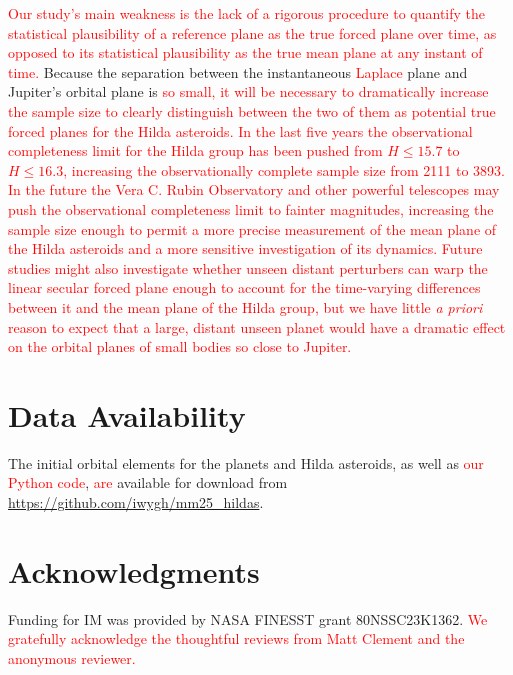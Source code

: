 \documentclass[a4paper,fleqn]{cas-sc}
\begin{document}
\begin{linenumbers}
\textcolor{red}{
Our study's main weakness is
the lack of a rigorous procedure to quantify the statistical plausibility of a reference plane as the true forced plane over time, as opposed to its statistical plausibility as the true mean plane at any instant of time.}
Because the separation between the instantaneous \textcolor{red}{Laplace} plane and  Jupiter's orbital plane is
\textcolor{red}{
so small, it will be necessary to dramatically increase the sample size to clearly distinguish between the two of them as potential true forced planes for the Hilda asteroids.
In the last five years the observational completeness limit for the Hilda group has been pushed from $H\leq15.7$ \citep{hendler2020observational} to $H\leq16.3$, increasing the observationally complete sample size from 2111 to 3893.
In the future the Vera C. Rubin Observatory and other powerful telescopes may push the observational completeness limit to fainter magnitudes, increasing the sample size enough to permit a more precise measurement of the mean plane of the Hilda asteroids and a more sensitive investigation of its dynamics.
Future studies might also investigate whether unseen distant perturbers can warp the linear secular forced plane enough to account for the time-varying differences between it and the mean plane of the Hilda group, but we have little \textit{a priori} reason to expect that a large, distant unseen planet would have a dramatic effect on the orbital planes of small bodies so close to Jupiter.
}




\section{Data Availability}
\label{s:data_availability}
The initial orbital elements for the planets and Hilda asteroids, as well as \textcolor{red}{our Python code}, \textcolor{red}{are} available for download from \url{https://github.com/iwygh/mm25_hildas}.


\section{Acknowledgments}
Funding for IM was provided by NASA FINESST grant 80NSSC23K1362.
\textcolor{red}{We gratefully acknowledge the thoughtful reviews from Matt Clement and the anonymous reviewer.}
\printcredits

%








\end{linenumbers}
\end{document}
